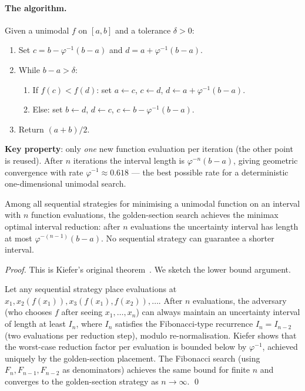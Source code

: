 \paragraph{The algorithm.}
Given a unimodal \(f\) on \([a, b]\) and a tolerance \(\delta > 0\):
\begin{enumerate}
  \item Set \(c = b - \varphi^{-1}(b-a)\) and
        \(d = a + \varphi^{-1}(b-a)\).
  \item While \(b - a > \delta\):
  \begin{enumerate}
    \item If \(f(c) < f(d)\): set \(a \leftarrow c\),
          \(c \leftarrow d\),
          \(d \leftarrow a + \varphi^{-1}(b-a)\).
    \item Else: set \(b \leftarrow d\),
          \(d \leftarrow c\),
          \(c \leftarrow b - \varphi^{-1}(b-a)\).
  \end{enumerate}
  \item Return \((a+b)/2\).
\end{enumerate}
\textbf{Key property}: only \emph{one} new function evaluation per
iteration (the other point is reused).  After \(n\) iterations the
interval length is \(\varphi^{-n}(b-a)\), giving geometric convergence
with rate \(\varphi^{-1} \approx 0.618\) — the best possible rate for
a deterministic one-dimensional unimodal search.

\begin{theorem}
\label{thm:gh-kiefer-optimality}
Among all sequential strategies for minimising a unimodal function
on an interval with \(n\) function evaluations,
the golden-section search achieves the minimax optimal interval
reduction: after \(n\) evaluations the uncertainty interval has
length at most \(\varphi^{-(n-1)}(b-a)\).
No sequential strategy can guarantee a shorter interval.
\end{theorem}

\begin{proof}
This is Kiefer's original theorem~\cite{kiefer1953sequential}.
We sketch the lower bound argument.

Let any sequential strategy place evaluations at
\(x_1, x_2(f(x_1)), x_3(f(x_1),f(x_2)), \ldots\).
After \(n\) evaluations, the adversary (who chooses \(f\) after seeing
\(x_1, \ldots, x_n\)) can always maintain an uncertainty interval of
length at least \(I_n\), where \(I_n\) satisfies the Fibonacci-type
recurrence \(I_n = I_{n-2}\) (two evaluations per reduction step),
modulo re-normalisation.  Kiefer shows that the worst-case
reduction factor per evaluation is bounded below by \(\varphi^{-1}\),
achieved uniquely by the golden-section placement.  The Fibonacci
search (using \(F_n, F_{n-1}, F_{n-2}\) as denominators)
achieves the same bound for finite \(n\) and converges to the
golden-section strategy as \(n \to \infty\).
\qed
\end{proof}

